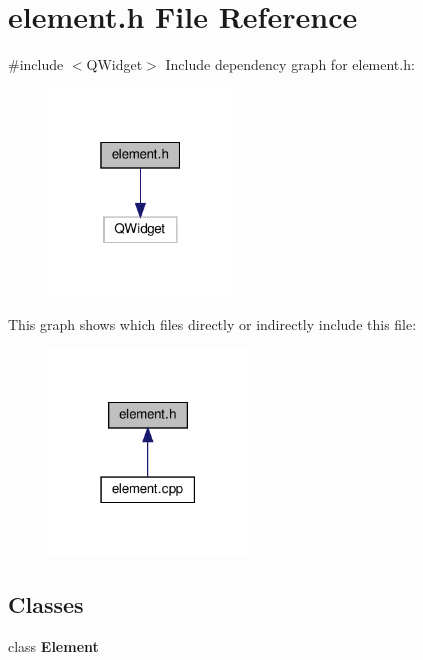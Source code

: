 \section{element.\+h File Reference}
\label{element_8h}
{\ttfamily \#include $<$Q\+Widget$>$}\newline
Include dependency graph for element.\+h\+:\nopagebreak
\begin{figure}[H]
\begin{center}
\leavevmode
\includegraphics[width=139pt]{element_8h__incl}
\end{center}
\end{figure}
This graph shows which files directly or indirectly include this file\+:\nopagebreak
\begin{figure}[H]
\begin{center}
\leavevmode
\includegraphics[width=150pt]{element_8h__dep__incl}
\end{center}
\end{figure}
\subsection*{Classes}
\begin{DoxyCompactItemize}
\item 
class \textbf{ Element}
\end{DoxyCompactItemize}
